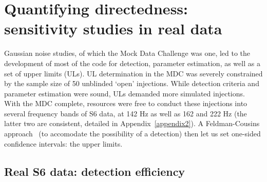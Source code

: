 
        \section{Quantifying directedness: sensitivity studies in real data}
        \label{quant_directed}

Gaussian noise studies, of which the Mock Data Challenge was one, led to the development of most of the code for detection, parameter estimation, as well as a set of upper limits (ULs).
UL determination in the MDC was severely constrained by the sample size of 50 unblinded `open' injections.
While detection criteria and parameter estimation were sound, ULs demanded more simulated injections.
With the MDC complete, resources were free to conduct these injections into several frequency bands of S6 data, at 142 Hz as well as 162 and 222 Hz (the latter two are consistent, detailed in Appendix~\ref{appendix2}).
A Feldman-Cousins approach~\cite{FeldmanCousins1998} (to accomodate the possibility of a detection) then let us set one-sided confidence intervals: the upper limits.





        \subsection{Real S6 data: detection efficiency}

